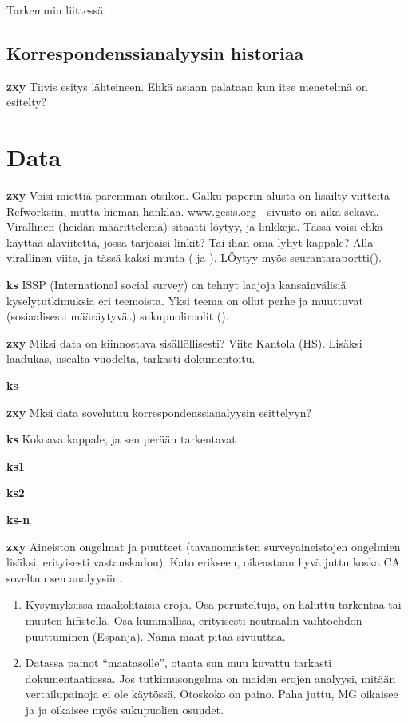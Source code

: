 \documentclass[finnish,]{book}
\begin{document}
Tarkemmin liittessä.

\hypertarget{korrespondenssianalyysin-historiaa}{%
\section{Korrespondenssianalyysin
historiaa}\label{korrespondenssianalyysin-historiaa}}

\textbf{zxy} Tiivis esitys lähteineen. Ehkä asiaan palataan kun itse
menetelmä on esitelty?

\hypertarget{data}{%
\chapter{Data}\label{data}}

\textbf{zxy} Voisi miettiä paremman otsikon. Galku-paperin alusta on
lisäilty viitteitä Refworksiin, mutta hieman hanklaa. www.gesis.org -
sivusto on aika sekava. Virallinen (heidän määrittelemä) sitaatti
löytyy, ja linkkejä. Tässä voisi ehkä käyttää alaviitettä, jossa
tarjoaisi linkit? Tai ihan oma lyhyt kappale? Alla virallinen viite, ja
tässä kaksi muuta (\citep{RefWorks:doc:5b6c7f6ce4b0e4e15164ab1a} ja
\citep{RefWorks:doc:5b6c7debe4b0e4e15164ab00}). LÖytyy myös
seurantaraportti(\citep{RefWorks:doc:5b155e0ce4b044dfd738458f}).

\textbf{ks} ISSP (International social survey) on tehnyt laajoja
kansainvälisiä kyselytutkimuksia eri teemoista. Yksi teema on ollut
perhe ja muuttuvat (sosiaalisesti määräytyvät) sukupuoliroolit
(\citep{RefWorks:doc:5b6c7b0de4b0fd36f5bb4c2a}).

\textbf{zxy} Miksi data on kiinnostava sisällöllisesti? Viite Kantola
(HS). Lisäksi laadukas, usealta vuodelta, tarkasti dokumentoitu.

\textbf{ks}

\textbf{zxy} Mksi data sovelutuu korrespondenssianalyysin esittelyyn?

\textbf{ks} Kokoava kappale, ja sen perään tarkentavat

\textbf{ks1}

\textbf{ks2}

\textbf{ks-n}

\textbf{zxy} Aineiston ongelmat ja puutteet (tavanomaisten
surveyaineistojen ongelmien lisäksi, erityisesti vastauskadon). Kato
erikseen, oikeastaan hyvä juttu koska CA soveltuu sen analyysiin.

\begin{enumerate}
\def\labelenumi{\arabic{enumi}.}
\item
  Kysymyksissä maakohtaisia eroja. Osa perusteltuja, on haluttu
  tarkentaa tai muuten hifistellä. Osa kummallisa, erityisesti
  neutraalin vaihtoehdon puuttuminen (Espanja). Nämä maat pitää
  sivuuttaa.
\item
  Datassa painot ``maatasolle'', otanta sun muu kuvattu tarkasti
  dokumentaatiossa. Jos tutkimusongelma on maiden erojen analyysi,
  mitään vertailupainoja ei ole käytössä. Otoskoko on paino. Paha juttu,
  MG oikaisee ja ja oikaisee myös sukupuolien osuudet.
\end{enumerate}
\end{document}
